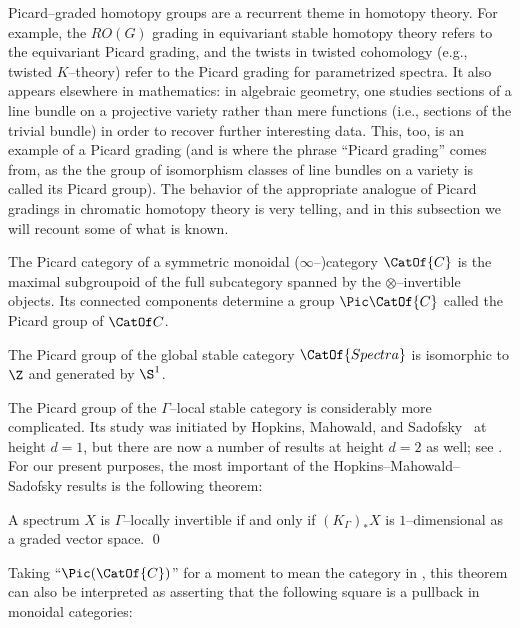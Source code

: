 Picard--graded homotopy groups are a recurrent theme in homotopy theory.  For example, the $RO(G)$ grading in equivariant stable homotopy theory refers to the equivariant Picard grading, and the twists in twisted cohomology (e.g., twisted $K$--theory) refer to the Picard grading for parametrized spectra.  It also appears elsewhere in mathematics: in algebraic geometry, one studies sections of a line bundle on a projective variety rather than mere functions (i.e., sections of the trivial bundle) in order to recover further interesting data.  This, too, is an example of a Picard grading (and is where the phrase ``Picard grading'' comes from, as the the group of isomorphism classes of line bundles on a variety is called its Picard group).  The behavior of the appropriate analogue of Picard gradings in chromatic homotopy theory is very telling, and in this subsection we will recount some of what is known.

\begin{definition}\label{DefnPicardGroup}
The Picard category of a symmetric monoidal ($\infty$--)category $\CatOf{C}$ is the maximal subgroupoid of the full subcategory spanned by the $\otimes$--invertible objects.  Its connected components determine a group $\Pic \CatOf{C}$ called the Picard group of $\CatOf C$.
\end{definition}

\begin{example}\label{GlobalPicardGroup}
The Picard group of the global stable category $\CatOf{Spectra}$ is isomorphic to $\Z$ and generated by $\S^1$.
\end{example}

The Picard group of the $\Gamma$--local stable category is considerably more complicated.  Its study was initiated by Hopkins, Mahowald, and Sadofsky~\cite{HMS} at height $d = 1$, but there are now a number of results at height $d = 2$ as well; see .  For our present purposes, the most important of the Hopkins--Mahowald--Sadofsky results is the following theorem:

\begin{theorem}\label{HMSLines}
A spectrum $X$ is $\Gamma$--locally invertible if and only if $(K_\Gamma)_* X$ is $1$--dimensional as a graded vector space. \qed
\end{theorem}

\begin{remark}
Taking ``$\Pic(\CatOf{C})$'' for a moment to mean the category in , this theorem can also be interpreted as asserting that the following square is a pullback in monoidal categories:
\begin{center}
\end{center}
\end{remark}

